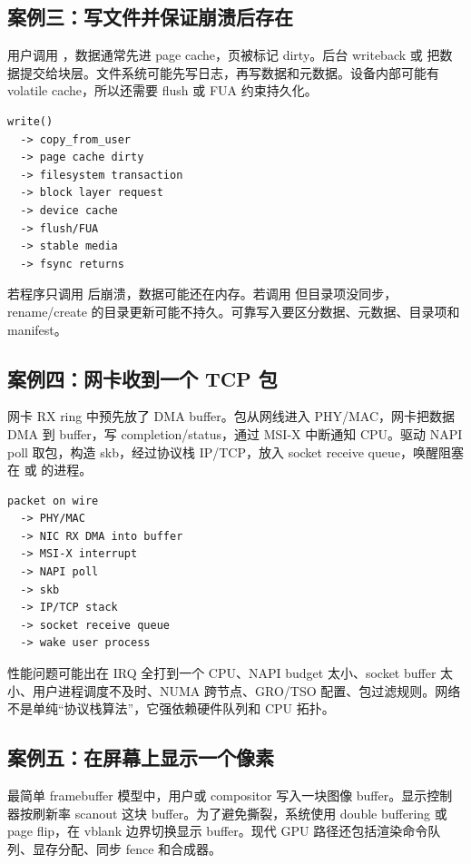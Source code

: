 \subsection{案例三：写文件并保证崩溃后存在}

用户调用 ，数据通常先进 page cache，页被标记 dirty。后台 writeback 或  把数据提交给块层。文件系统可能先写日志，再写数据和元数据。设备内部可能有 volatile cache，所以还需要 flush 或 FUA 约束持久化。

\begin{lstlisting}
write()
  -> copy_from_user
  -> page cache dirty
  -> filesystem transaction
  -> block layer request
  -> device cache
  -> flush/FUA
  -> stable media
  -> fsync returns
\end{lstlisting}

若程序只调用  后崩溃，数据可能还在内存。若调用  但目录项没同步，rename/create 的目录更新可能不持久。可靠写入要区分数据、元数据、目录项和 manifest。

\subsection{案例四：网卡收到一个 TCP 包}

网卡 RX ring 中预先放了 DMA buffer。包从网线进入 PHY/MAC，网卡把数据 DMA 到 buffer，写 completion/status，通过 MSI-X 中断通知 CPU。驱动 NAPI poll 取包，构造 skb，经过协议栈 IP/TCP，放入 socket receive queue，唤醒阻塞在  或  的进程。

\begin{lstlisting}
packet on wire
  -> PHY/MAC
  -> NIC RX DMA into buffer
  -> MSI-X interrupt
  -> NAPI poll
  -> skb
  -> IP/TCP stack
  -> socket receive queue
  -> wake user process
\end{lstlisting}

性能问题可能出在 IRQ 全打到一个 CPU、NAPI budget 太小、socket buffer 太小、用户进程调度不及时、NUMA 跨节点、GRO/TSO 配置、包过滤规则。网络不是单纯“协议栈算法”，它强依赖硬件队列和 CPU 拓扑。

\subsection{案例五：在屏幕上显示一个像素}

最简单 framebuffer 模型中，用户或 compositor 写入一块图像 buffer。显示控制器按刷新率 scanout 这块 buffer。为了避免撕裂，系统使用 double buffering 或 page flip，在 vblank 边界切换显示 buffer。现代 GPU 路径还包括渲染命令队列、显存分配、同步 fence 和合成器。


